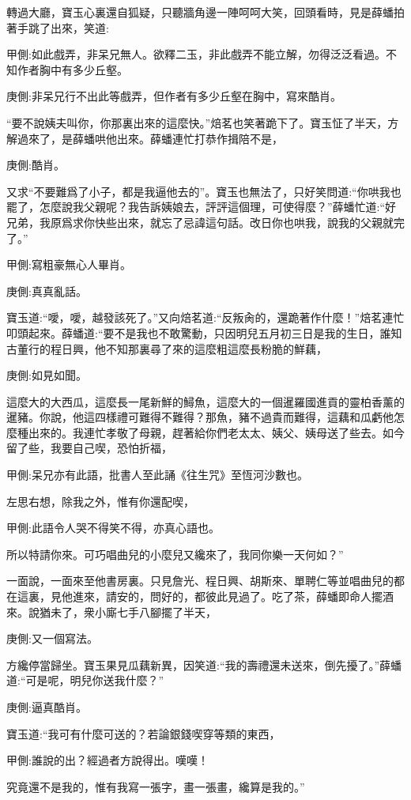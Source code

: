 \begin{parag}
    轉過大廳，寶玉心裏還自狐疑，只聽牆角邊一陣呵呵大笑，回頭看時，見是薛蟠拍著手跳了出來，笑道:\begin{note}甲側:如此戲弄，非呆兄無人。欲釋二玉，非此戲弄不能立解，勿得泛泛看過。不知作者胸中有多少丘壑。\end{note}\begin{note}庚側:非呆兄行不出此等戲弄，但作者有多少丘壑在胸中，寫來酷肖。\end{note}“要不說姨夫叫你，你那裏出來的這麼快。”焙茗也笑著跪下了。寶玉怔了半天，方解過來了，是薛蟠哄他出來。薛蟠連忙打恭作揖陪不是，\begin{note}庚側:酷肖。\end{note}又求“不要難爲了小子，都是我逼他去的”。寶玉也無法了，只好笑問道:“你哄我也罷了，怎麼說我父親呢？我告訴姨娘去，評評這個理，可使得麼？”薛蟠忙道:“好兄弟，我原爲求你快些出來，就忘了忌諱這句話。改日你也哄我，說我的父親就完了。”\begin{note}甲側:寫粗豪無心人畢肖。\end{note}\begin{note}庚側:真真亂話。\end{note}寶玉道:“噯，噯，越發該死了。”又向焙茗道:“反叛肏的，還跪著作什麼！”焙茗連忙叩頭起來。薛蟠道:“要不是我也不敢驚動，只因明兒五月初三日是我的生日，誰知古董行的程日興，他不知那裏尋了來的這麼粗這麼長粉脆的鮮藕，\begin{note}庚側:如見如聞。\end{note}這麼大的大西瓜，這麼長一尾新鮮的鱘魚，這麼大的一個暹羅國進貢的靈柏香薰的暹豬。你說，他這四樣禮可難得不難得？那魚，豬不過貴而難得，這藕和瓜虧他怎麼種出來的。我連忙孝敬了母親，趕著給你們老太太、姨父、姨母送了些去。如今留了些，我要自己喫，恐怕折福，\begin{note}甲側:呆兄亦有此語，批書人至此誦《往生咒》至恆河沙數也。\end{note}左思右想，除我之外，惟有你還配喫，\begin{note}甲側:此語令人哭不得笑不得，亦真心語也。\end{note}所以特請你來。可巧唱曲兒的小麼兒又纔來了，我同你樂一天何如？”
\end{parag}


\begin{parag}
    一面說，一面來至他書房裏。只見詹光、程日興、胡斯來、單聘仁等並唱曲兒的都在這裏，見他進來，請安的，問好的，都彼此見過了。吃了茶，薛蟠即命人擺酒來。說猶未了，衆小廝七手八腳擺了半天，\begin{note}庚側:又一個寫法。\end{note}方纔停當歸坐。寶玉果見瓜藕新異，因笑道:“我的壽禮還未送來，倒先擾了。”薛蟠道:“可是呢，明兒你送我什麼？”\begin{note}庚側:逼真酷肖。\end{note}寶玉道:“我可有什麼可送的？若論銀錢喫穿等類的東西，\begin{note}甲側:誰說的出？經過者方說得出。嘆嘆！\end{note}究竟還不是我的，惟有我寫一張字，畫一張畫，纔算是我的。”
\end{parag}


